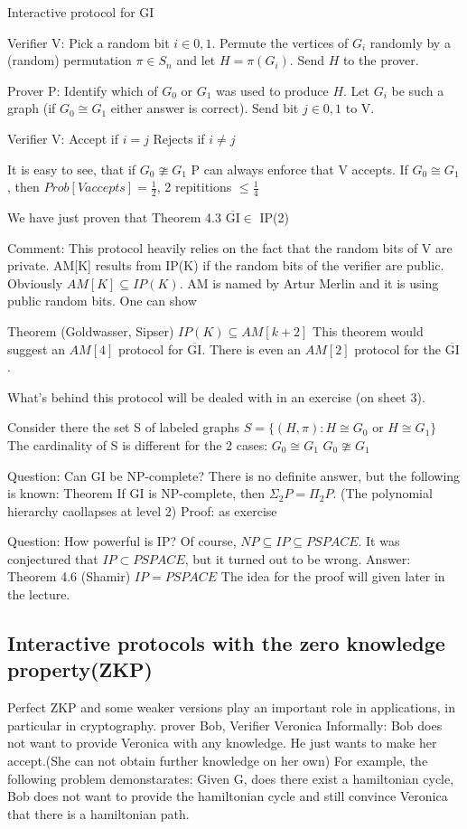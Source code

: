 \documentclass[11pt]{article}
\theoremstyle{definition}
\theoremstyle{definition}
\begin{document}
Interactive protocol for GI

Verifier V: Pick a random bit $i \in {0,1}$. Permute the vertices of $G_i$ randomly by a (random) permutation $\pi \in S_n$ and let $ H = \pi(G_i) $. Send $H$ to the prover.

Prover P: Identify which of $G_0$ or $G_1$ was used to produce $H$. Let $G_i$ be such a graph (if $G_0 \cong G_1$ either answer is correct). Send bit $j \in {0,1}$ to V.

Verifier V: 
Accept if $i=j$
Rejects if $i \neq j$

It is easy to see, that if $G_0 \ncong G_1$ P can always enforce that V accepts. If $G_0 \cong G_1$, then $Prob[V accepts] = \frac{1}{2}$, 2 repititions $ \leq \frac{1}{4}$

We have just proven that Theorem 4.3 $ \overline{\text{GI}} \in $ IP(2)

Comment: This protocol heavily relies on the fact that the random bits of V are private. AM[K] results from IP(K) if the random bits of the verifier are public. Obviously $AM[K] \subseteq IP(K)$. AM is named by Artur Merlin and it is using public random bits. One can show

Theorem (Goldwasser, Sipser)
$IP(K) \subseteq AM[k+2]$
This theorem would suggest an $AM[4]$ protocol for $ \overline{\text{GI}} $. There is even an $AM[2]$ protocol for the $ \overline{\text{GI}} $.

What's behind this protocol will be dealed with in an exercise (on sheet 3).

Consider there the set S of labeled graphs $S=\{(H,\pi): H \cong G_0 $ or $ H \cong G_1\}$ The cardinality of S is different for the 2 cases:
$G_0 \cong G_1$
$G_0 \ncong G_1$

Question: Can GI be NP-complete?
There is no definite answer, but the following is known:
Theorem If GI is NP-complete, then $\Sigma_2 P = \Pi_2 P$. (The polynomial hierarchy caollapses at level 2)
Proof: as exercise

Question: How powerful is IP?
Of course, $NP \subseteq IP \subseteq PSPACE$. It was conjectured that $IP \subset PSPACE$, but it turned out to be wrong.
Answer:
Theorem 4.6 (Shamir) $IP = PSPACE$
The idea for the proof will given later in the lecture.

\subsection{Interactive protocols with the zero knowledge property(ZKP)}
Perfect ZKP and some weaker versions play an important role in applications, in particular in cryptography.
prover Bob, Verifier Veronica
Informally: Bob does not want to provide Veronica with any knowledge. He just wants to make her accept.(She can not obtain further knowledge on her own)
For example, the following problem demonstarates: Given G, does there exist a hamiltonian cycle, Bob does not want to provide the hamiltonian cycle and still convince Veronica that there is a hamiltonian path.
\end{document}

